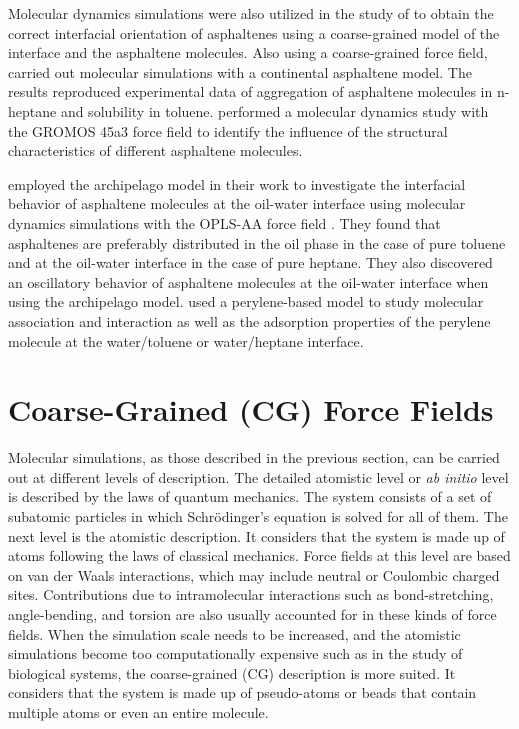 Molecular dynamics simulations were also utilized in the study of   to obtain the correct interfacial orientation of asphaltenes using a coarse-grained model of the interface and the asphaltene molecules. Also using a coarse-grained force field,  carried out molecular simulations with a continental asphaltene model. The results reproduced experimental data of aggregation
of asphaltene molecules in n-heptane and solubility in toluene.  performed a molecular
dynamics study with the GROMOS 45a3 force field \cite{JCC:JCC1078} to identify the influence of the structural characteristics of different asphaltene molecules.

 employed the archipelago model in their work to investigate the interfacial behavior of asphaltene molecules at the oil-water interface using molecular dynamics simulations with the OPLS-AA force field \cite{doi:10.1021/ja00214a001}. They found that asphaltenes are preferably distributed in the oil phase in the case of pure toluene and at the oil-water interface
in the case of pure heptane. They also discovered an
oscillatory behavior of asphaltene molecules at the oil-water interface when using the archipelago model.  used a perylene-based model to study molecular association and interaction as well as the adsorption properties of the perylene molecule at the water/toluene or water/heptane interface. 

\section{Coarse-Grained (CG) Force Fields}\label{cgff}


Molecular simulations, as those described in the previous section, can be carried out at different levels of description. The detailed atomistic level or \textit{ab initio} level is described by the laws of quantum mechanics. The system consists of a set of subatomic particles in which Schr\"{o}dinger's equation is solved for all of them. The next level is the atomistic description. It considers that the system is made up of atoms following the laws of classical mechanics.  Force fields at this level are based on van der Waals interactions, which may include neutral or Coulombic charged sites. Contributions due to intramolecular interactions such as bond-stretching, angle-bending, and torsion are also usually accounted for in these kinds of force fields. When the simulation scale needs to be increased, and the atomistic simulations become too computationally expensive such as in the study of biological systems, the coarse-grained (CG) description is more suited. It considers that the system is made up of pseudo-atoms or beads that contain multiple atoms or even an entire molecule. 


